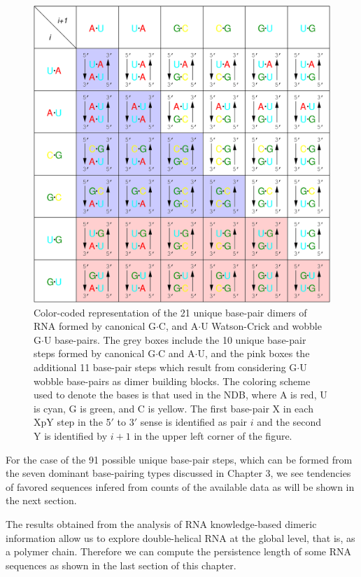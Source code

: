 \begin{figure}
\centering
\includegraphics[angle=0, scale=0.4]{Chapter4/unique.png}
\caption{Color-coded representation of  the 21 unique base-pair dimers
of RNA  formed by canonical G$\cdot$C, and  A$\cdot$U Watson-Crick and
wobble  G$\cdot$U base-pairs.  The  grey boxes  include the  10 unique
base-pair steps  formed by canonical G$\cdot$C and  A$\cdot$U, and the
pink  boxes  the  additional  11  base-pair steps  which  result  from
considering G$\cdot$U wobble base-pairs  as dimer building blocks. The
coloring scheme  used to  denote the  bases is that  used in  the NDB,
where A  is red, U is  cyan, G is green,  and C is  yellow.  The first
base-pair X in  each XpY step in the 5$'$ to  3$'$ sense is identified
as pair $i$ and the second Y  is identified by $i+1$ in the upper left
corner of the figure.}
\label{fig:unique}
\end{figure}  

For the case  of the 91 possible unique base-pair  steps, which can be
formed from the seven dominant base-pairing types discussed in Chapter
3, we see  tendencies of favored sequences infered  from counts of the
available data as will be shown in the next section.

The results obtained from  the analysis of RNA knowledge-based dimeric
information  allow us  to  explore double-helical  RNA  at the  global
level,  that is,  as a  polymer chain.  Therefore we  can  compute the
persistence length of some RNA  sequences as shown in the last section
of this chapter.

